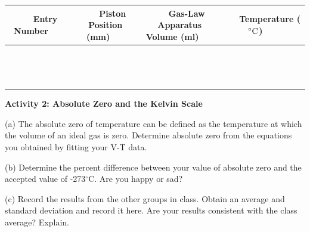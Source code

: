 \vspace{0.3cm}
{\centering \begin{tabular}{|c|c|c|c|}
\hline 
~~~Entry Number~~~&
~~~Piston Position (mm)~~~&
~~~Gas-Law Apparatus Volume (ml)~~~&
~~~Temperature ($^\circ  \rm C$)~~~\\
\hline
\hline 
&
&
&
\\
\hline 
&
&
&
\\
\hline 
&
&
&
\\
\hline 
&
&
&
\\
\hline 
&
&
&
\\
\hline 
&
&
&
\\
\hline 
&
&
&
\\
\hline 
&
&
&
\\
\hline 
&
&
&
\\
\hline
&
&
&
\\
\hline
&
&
&
\\
\hline
&
&
&
\\
\hline
&
&
&
\\
\hline
&
&
&
\\
\hline
\end{tabular}\par}
\vspace{2.0cm}

\textbf{Activity 2: Absolute Zero and the Kelvin Scale}

(a) The absolute zero of temperature can be defined as the temperature
at which the volume of an ideal gas is zero. Determine absolute
zero from the equations you obtained by fitting your V-T data.
\vspace{30mm}

(b) Determine the percent difference between your value of absolute
zero and the accepted value of -273\( ^{\circ } \)C. Are you happy or sad?
\vspace{30mm}

(c) Record the results from the other groups in class.
Obtain an average and standard deviation and record it here.
Are your results consistent with the class average? Explain.

